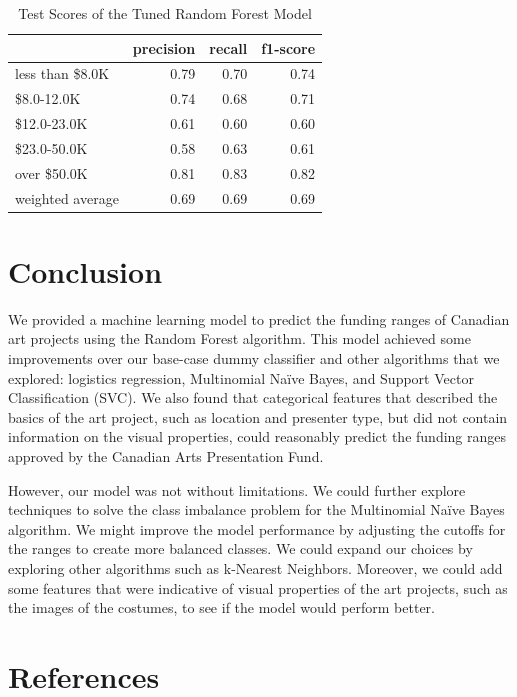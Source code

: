 \documentclass[
]{article}
\begin{document}
\begin{table}[!h]

\caption{\label{tab:best_model}Test Scores of the Tuned Random Forest Model}
\centering
\begin{tabular}[t]{l|r|r|r}
\hline
 & precision & recall & f1-score\\
\hline
less than \$8.0K & 0.79 & 0.70 & 0.74\\
\hline
\$8.0-12.0K & 0.74 & 0.68 & 0.71\\
\hline
\$12.0-23.0K & 0.61 & 0.60 & 0.60\\
\hline
\$23.0-50.0K & 0.58 & 0.63 & 0.61\\
\hline
over \$50.0K & 0.81 & 0.83 & 0.82\\
\hline
weighted average & 0.69 & 0.69 & 0.69\\
\hline
\end{tabular}
\end{table}

\hypertarget{conclusion}{%
\section{Conclusion}\label{conclusion}}

We provided a machine learning model to predict the funding ranges of
Canadian art projects using the Random Forest algorithm. This model
achieved some improvements over our base-case dummy classifier and other
algorithms that we explored: logistics regression, Multinomial Naïve
Bayes, and Support Vector Classification (SVC). We also found that
categorical features that described the basics of the art project, such
as location and presenter type, but did not contain information on the
visual properties, could reasonably predict the funding ranges approved
by the Canadian Arts Presentation Fund.

However, our model was not without limitations. We could further explore
techniques to solve the class imbalance problem for the Multinomial
Naïve Bayes algorithm. We might improve the model performance by
adjusting the cutoffs for the ranges to create more balanced classes. We
could expand our choices by exploring other algorithms such as k-Nearest
Neighbors. Moreover, we could add some features that were indicative of
visual properties of the art projects, such as the images of the
costumes, to see if the model would perform better.

\hypertarget{references}{%
\section*{References}\label{references}}
\end{document}
